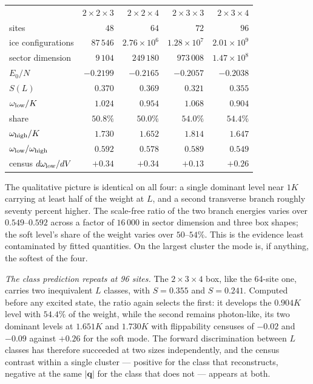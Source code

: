\documentclass[aps,prl,twocolumn,amsmath,amssymb,superscriptaddress,
longbibliography,floatfix]{revtex4-2}
\newcommand{\bq}{\bm q}
\begin{document}
\begin{center}
\begin{tabular}{lrrrr}
\hline\hline
 & $2{\times}2{\times}3$ & $2{\times}2{\times}4$ &
   $2{\times}3{\times}3$ & $2{\times}3{\times}4$\\
sites & $48$ & $64$ & $72$ & $96$\\
ice configurations & $87\,546$ & $2.76{\times}10^{6}$
  & $1.28{\times}10^{7}$ & $2.01{\times}10^{9}$\\
sector dimension & $9\,104$ & $249\,180$ & $973\,008$
  & $1.47{\times}10^{8}$\\
\hline
$E_0/N$ & $-0.2199$ & $-0.2165$ & $-0.2057$ & $-0.2038$\\
$S(L)$ & $0.370$ & $0.369$ & $0.321$ & $0.355$\\
$\omega_{\rm low}/K$ & $1.024$ & $0.954$ & $1.068$ & $0.904$\\
share & $50.8\%$ & $50.0\%$ & $54.0\%$ & $54.4\%$\\
$\omega_{\rm high}/K$ & $1.730$ & $1.652$ & $1.814$ & $1.647$\\
$\omega_{\rm low}/\omega_{\rm high}$ & $0.592$ & $0.578$ & $0.589$
  & $0.549$\\
census $d\omega_{\rm low}/dV$ & $+0.34$ & $+0.34$ & $+0.13$ & $+0.26$\\
\hline\hline
\end{tabular}
\end{center}

The qualitative picture is identical on all four: a single dominant
level near $1K$ carrying at least half of the weight at $L$, and a
second transverse branch roughly seventy percent higher. The
scale-free ratio of the two branch energies varies over
$0.549$--$0.592$ across a factor of $16\,000$ in sector dimension and
three box shapes; the soft level's share of the weight varies over
$50$--$54\%$. This is the evidence least contaminated by fitted
quantities. On the largest cluster the mode is, if anything, the
softest of the four.

\emph{The class prediction repeats at 96 sites.} The
$2{\times}3{\times}4$ box, like the 64-site one, carries two
inequivalent $L$ classes, with $S=0.355$ and $S=0.241$. Computed
before any excited state, the ratio again selects the first: it
develops the $0.904K$ level with $54.4\%$ of the weight, while the
second remains photon-like, its two dominant levels at $1.651K$ and
$1.730K$ with flippability censuses of $-0.02$ and $-0.09$ against
$+0.26$ for the soft mode. The forward discrimination between $L$
classes has therefore succeeded at two sizes independently, and the
census contrast within a single cluster --- positive for the class
that reconstructs, negative at the same $|\bq|$ for the class that
does not --- appears at both.
\end{document}

